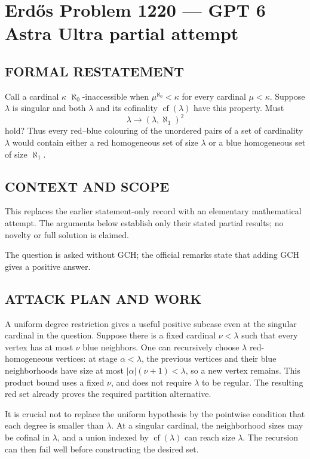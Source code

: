 \section*{Erd\H{o}s Problem 1220 --- GPT 6 Astra Ultra partial attempt}


\subsection*{FORMAL RESTATEMENT}
Call a cardinal $\kappa$ $\aleph_0$-inaccessible when $\mu^{\aleph_0}<\kappa$ for every cardinal $\mu<\kappa$. Suppose $\lambda$ is singular and both $\lambda$ and its cofinality $\operatorname{cf}(\lambda)$ have this property. Must
\[\lambda\longrightarrow(\lambda,\aleph_1)^2\]
hold? Thus every red--blue colouring of the unordered pairs of a set of cardinality $\lambda$ would contain either a red homogeneous set of size $\lambda$ or a blue homogeneous set of size $\aleph_1$.

\subsection*{CONTEXT AND SCOPE}
This replaces the earlier statement-only record with an elementary mathematical attempt. The arguments below establish only their stated partial results; no novelty or full solution is claimed.

The question is asked without GCH; the official remarks state that adding GCH gives a positive answer.

\subsection*{ATTACK PLAN AND WORK}
A uniform degree restriction gives a useful positive subcase even at the
singular cardinal in the question. Suppose there is a fixed cardinal
$\nu<\lambda$ such that every vertex has at most $\nu$ blue neighbors.
One can recursively choose $\lambda$ red-homogeneous vertices: at stage
$\alpha<\lambda$, the previous vertices and their blue neighborhoods have
size at most $|\alpha|(\nu+1)<\lambda$, so a new vertex remains.
This product bound uses a fixed $\nu$, and does not require $\lambda$ to be regular.
The resulting red set already proves the required partition alternative.

It is crucial not to replace the uniform hypothesis by the pointwise condition
that each degree is smaller than $\lambda$. At a singular cardinal, the
neighborhood sizes may be cofinal in $\lambda$, and a union indexed by
$\operatorname{cf}(\lambda)$ can reach size $\lambda$.
The recursion can then fail well before constructing the desired set.

